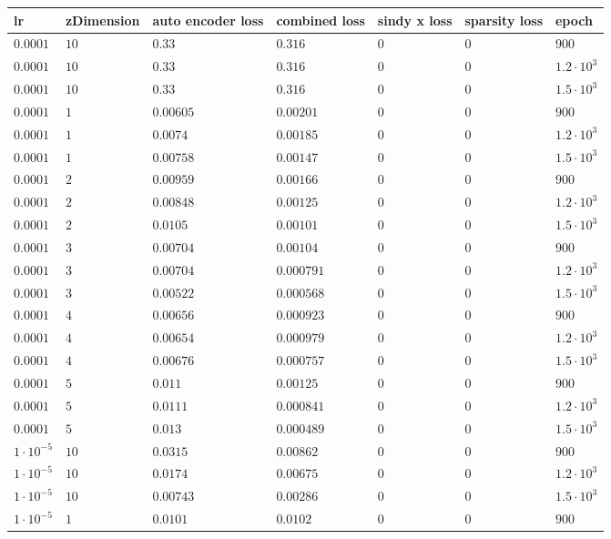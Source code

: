 \begin{table}[tbp]
\begin{tabular}{lllllll}
lr & zDimension & auto encoder loss & combined loss & sindy x loss & sparsity loss & epoch \\ \hline
$0.0001$ & $10$ & $0.33$ & $0.316$ & $0$ & $0$ & $900$ \\
$0.0001$ & $10$ & $0.33$ & $0.316$ & $0$ & $0$ & $1.2\cdot 10^{3}$ \\
$0.0001$ & $10$ & $0.33$ & $0.316$ & $0$ & $0$ & $1.5\cdot 10^{3}$ \\
$0.0001$ & $1$ & $0.00605$ & $0.00201$ & $0$ & $0$ & $900$ \\
$0.0001$ & $1$ & $0.0074$ & $0.00185$ & $0$ & $0$ & $1.2\cdot 10^{3}$ \\
$0.0001$ & $1$ & $0.00758$ & $0.00147$ & $0$ & $0$ & $1.5\cdot 10^{3}$ \\
$0.0001$ & $2$ & $0.00959$ & $0.00166$ & $0$ & $0$ & $900$ \\
$0.0001$ & $2$ & $0.00848$ & $0.00125$ & $0$ & $0$ & $1.2\cdot 10^{3}$ \\
$0.0001$ & $2$ & $0.0105$ & $0.00101$ & $0$ & $0$ & $1.5\cdot 10^{3}$ \\
$0.0001$ & $3$ & $0.00704$ & $0.00104$ & $0$ & $0$ & $900$ \\
$0.0001$ & $3$ & $0.00704$ & $0.000791$ & $0$ & $0$ & $1.2\cdot 10^{3}$ \\
$0.0001$ & $3$ & $0.00522$ & $0.000568$ & $0$ & $0$ & $1.5\cdot 10^{3}$ \\
$0.0001$ & $4$ & $0.00656$ & $0.000923$ & $0$ & $0$ & $900$ \\
$0.0001$ & $4$ & $0.00654$ & $0.000979$ & $0$ & $0$ & $1.2\cdot 10^{3}$ \\
$0.0001$ & $4$ & $0.00676$ & $0.000757$ & $0$ & $0$ & $1.5\cdot 10^{3}$ \\
$0.0001$ & $5$ & $0.011$ & $0.00125$ & $0$ & $0$ & $900$ \\
$0.0001$ & $5$ & $0.0111$ & $0.000841$ & $0$ & $0$ & $1.2\cdot 10^{3}$ \\
$0.0001$ & $5$ & $0.013$ & $0.000489$ & $0$ & $0$ & $1.5\cdot 10^{3}$ \\
$1\cdot 10^{-5}$ & $10$ & $0.0315$ & $0.00862$ & $0$ & $0$ & $900$ \\
$1\cdot 10^{-5}$ & $10$ & $0.0174$ & $0.00675$ & $0$ & $0$ & $1.2\cdot 10^{3}$ \\
$1\cdot 10^{-5}$ & $10$ & $0.00743$ & $0.00286$ & $0$ & $0$ & $1.5\cdot 10^{3}$ \\
$1\cdot 10^{-5}$ & $1$ & $0.0101$ & $0.0102$ & $0$ & $0$ & $900$ \\

\end{tabular}
\end{table}
